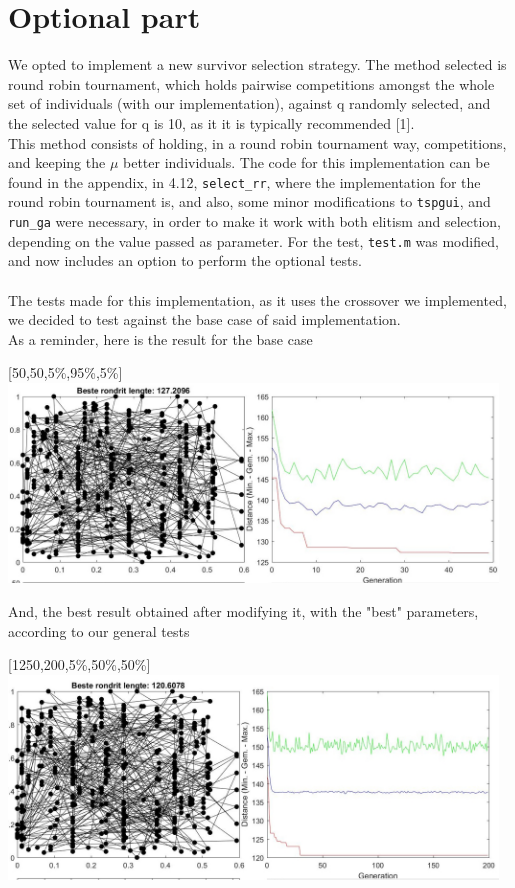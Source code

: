 \section{Optional part}

We opted to implement a new survivor selection strategy. The method selected
is round robin tournament, which holds pairwise competitions amongst the
whole set of individuals (with our implementation), against q randomly
selected, and the selected value for q is 10, as it it is typically
recommended [1].\\ 
This method consists of holding, in a round robin tournament way,
competitions, and keeping the $\mu$ better individuals.
The code for this implementation can be found in the appendix, in 4.12,
\texttt{select\_rr}, where the implementation for the round robin tournament is, and
also, some minor modifications to \texttt{tspgui}, and \texttt{run\_ga} were necessary, in
order to make it work with both elitism and selection, depending on the value
passed as parameter. For the test, \texttt{test.m} was modified, and now includes
an option to perform the optional tests.\\
\\
The tests made for this implementation, as it uses the crossover we
implemented, we decided to test against the base case of said
implementation. \\
As a reminder, here is the result for the base case\\

\begin{center}
[50,50,5\%,95\%,5\%]\\
\includegraphics[width=13cm]{img/specific/order_crossover/general_1.jpg}
\end{center}

And, the best result obtained after modifying it, with the "best"
parameters, according to our general tests\\

\begin{center}
[1250,200,5\%,50\%,50\%]\\
\includegraphics[width=13cm]{img/specific/order_crossover/general_8.jpg}
\end{center}

